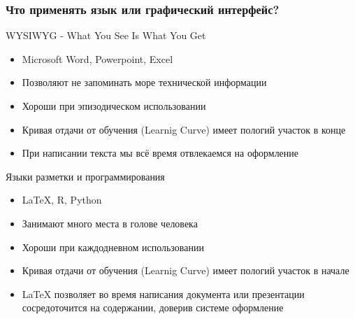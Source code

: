 \documentclass[10pt,pdf,hyperref={unicode}]{beamer}
\begin{document}
\begin{frame}[shrink]
    \frametitle{Что применять язык  или графический интерфейс?}
    \begin{block}{WYSIWYG - What You See Is What You Get}
      \begin{itemize}
          \item Microsoft Word, Powerpoint, Excel
          \item Позволяют не запоминать море технической информации 
          \item Хороши при эпизодическом использовании 
          \item Кривая отдачи от обучения (Learnig Curve) имеет пологий участок в конце 
          \item При написании текста мы всё время отвлекаемся на оформление
        \end{itemize}
        
    \end{block}
    
    \begin{block}{Языки разметки и программирования}
        \begin{itemize}
            \item \LaTeX{}, R, Python
            \item Занимают много места в голове человека  
            \item Хороши при каждодневном использовании 
            \item Кривая отдачи от обучения (Learnig Curve) имеет пологий участок в начале
            \item \LaTeX{} позволяет во время написания документа или презентации сосредоточится на содержании, доверив системе оформление 
        \end{itemize}     
    \end{block}
    
\end{frame}
\end{document}

